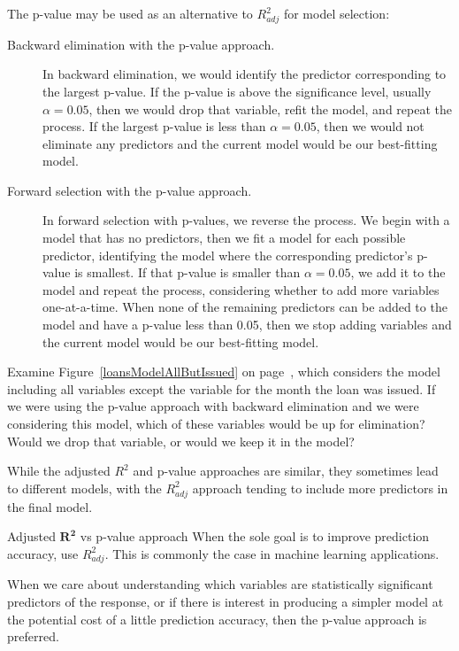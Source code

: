 \noindent%
The p-value may be used as an alternative to $R_{adj}^2$
for model selection:
\begin{description}
\item[Backward elimination with the p-value approach.]
    In backward elimination, we would identify the predictor
    corresponding to the largest p-value.
    If the p-value is above the significance level,
    usually $\alpha = 0.05$, then we would drop that variable,
    refit the model, and repeat the process.
    If the largest p-value is less than $\alpha = 0.05$,
    then we would not eliminate any predictors and the current
    model would be our best-fitting model.
\item[Forward selection with the p-value approach.]
    In forward selection with p-values, we reverse the process.
    We begin with a model that has no predictors, then we fit
    a model for each possible predictor, identifying the model
    where the corresponding predictor's p-value is smallest.
    If that p-value is smaller than $\alpha = 0.05$, we add
    it to the model and repeat the process, considering whether
    to add more variables one-at-a-time.
    When none of the remaining predictors can be added to the
    model and have a p-value less than 0.05,
    then we stop adding variables and the current model would
    be our best-fitting model.
\end{description}

\begin{exercisewrap}
\begin{nexercise}
Examine Figure~\ref{loansModelAllButIssued} on
page~\pageref{loansModelAllButIssued}, which considers the
model including all variables except the variable for the month
the loan was issued.
If we were using the p-value approach with backward elimination
and we were considering this model, which of these variables
would be up for elimination?
Would we drop that variable, or would we keep it in the
model?\footnotemark
\end{nexercise}
\end{exercisewrap}

While the adjusted $R^2$ and p-value approaches are similar,
they sometimes lead to different models, with the $R_{adj}^2$
approach tending to include more predictors in the final model.

\begin{onebox}{Adjusted $\mathbf{R^2}$ vs p-value approach}
  When the sole goal is to improve prediction accuracy,
  use $R_{adj}^2$.
  This is commonly the case in machine learning
  applications.\vspace{3mm}

  When we care about understanding which variables are
  statistically significant predictors of the response,
  or if there is interest in producing a simpler model
  at the potential cost of a little prediction accuracy,
  then the p-value approach is preferred.
\end{onebox}

